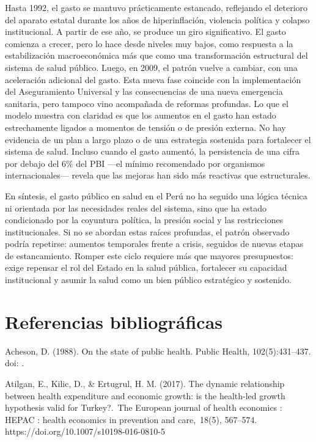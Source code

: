 \documentclass[12pt]{article}
\begin{document}
Hasta 1992, el gasto se mantuvo prácticamente estancado, reflejando el deterioro del aparato estatal durante los años de hiperinflación, violencia política y colapso institucional. A partir de ese año, se produce un giro significativo. El gasto comienza a crecer, pero lo hace desde niveles muy bajos, como respuesta a la estabilización macroeconómica más que como una transformación estructural del sistema de salud público. Luego, en 2009, el patrón vuelve a cambiar, con una aceleración adicional del gasto. Esta nueva fase coincide con la implementación del Aseguramiento Universal y las consecuencias de una nueva emergencia sanitaria, pero tampoco vino acompañada de reformas profundas. Lo que el modelo muestra con claridad es que los aumentos en el gasto han estado estrechamente ligados a momentos de tensión o de presión externa. No hay evidencia de un plan a largo plazo o de una estrategia sostenida para fortalecer el sistema de salud. Incluso cuando el gasto aumentó, la persistencia de una cifra por debajo del 6\% del PBI —el mínimo recomendado por organismos internacionales— revela que las mejoras han sido más reactivas que estructurales.

\bigskip
\bigskip
\bigskip

En síntesis, el gasto público en salud en el Perú no ha seguido una lógica técnica ni orientada por las necesidades reales del sistema, sino que ha estado condicionado por la coyuntura política, la presión social y las restricciones institucionales. Si no se abordan estas raíces profundas, el patrón observado podría repetirse: aumentos temporales frente a crisis, seguidos de nuevas etapas de estancamiento. Romper este ciclo requiere más que mayores presupuestos: exige repensar el rol del Estado en la salud pública, fortalecer su capacidad institucional y asumir la salud como un bien público estratégico y sostenido.

\section{Referencias bibliográficas}

Acheson, D. (1988). On the state of public health. Public Health, 102(5):431–437. doi: . 

Atilgan, E., Kilic, D., \& Ertugrul, H. M. (2017). The dynamic relationship between health expenditure and economic growth: is the health-led growth hypothesis valid for Turkey?. The European journal of health economics : HEPAC : health economics in prevention and care, 18(5), 567–574. https://doi.org/10.1007/s10198-016-0810-5
\end{document}
